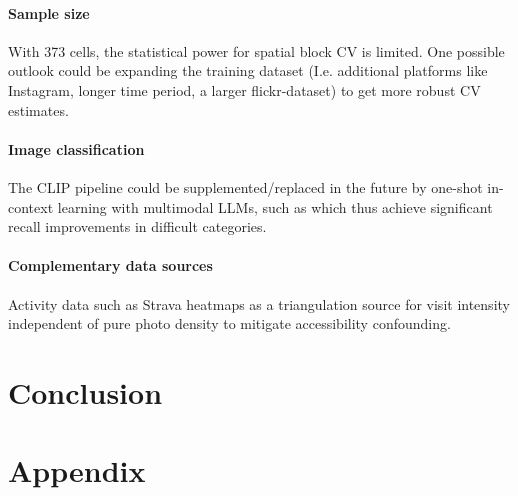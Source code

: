 \documentclass[11pt]{article}
\renewcommand{\_}{\textunderscore\allowbreak{}}
\begin{document}
\paragraph{Sample size}
With 373 cells, the statistical power for spatial block CV is limited. One possible outlook could be expanding the training dataset (I.e. additional platforms like Instagram, longer time period, a larger flickr-dataset) to get more robust CV estimates.
\paragraph{Image classification}
The CLIP pipeline could be supplemented/replaced in the future by one-shot in-context learning with multimodal LLMs, such as \citet{liao_mapping_2025} which thus achieve significant recall improvements in difficult categories.
\paragraph{Complementary data sources}
Activity data such as Strava heatmaps \citep{despotovic_beautiful_2025} as a triangulation source for visit intensity independent of pure photo density to mitigate accessibility confounding.

\section{Conclusion}



\section{Appendix}\label{sec:appendix}
\end{document}
